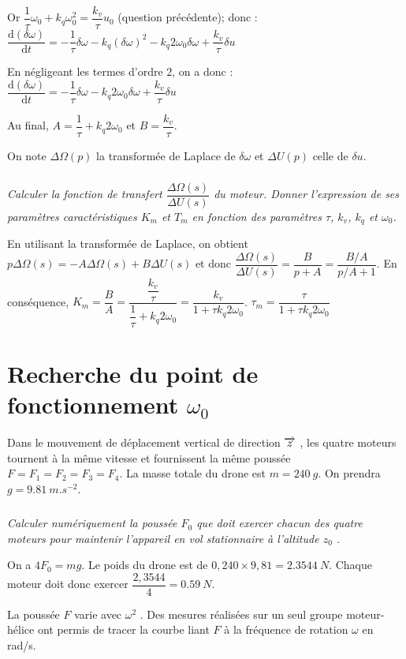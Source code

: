 \begin{multicols}{2}
\begin{corrige}
Or $\dfrac{1}{\tau}\omega_0 +k_q\omega_0^2 = \dfrac{k_v}{\tau}u_0$ (question précédente); donc :
$
\dfrac{\text{d}\left(\delta \omega \right)}{\text{d}t}= -\dfrac{1}{\tau}\delta \omega-k_q\left(\delta\omega\right)^2 -k_q2 \omega_0 \delta\omega + \dfrac{k_v}{\tau} \delta u
$

En négligeant les termes d'ordre 2, on a donc : 
$
\dfrac{\text{d}\left(\delta \omega \right)}{\text{d}t}= -\dfrac{1}{\tau}\delta \omega -k_q2 \omega_0 \delta\omega + \dfrac{k_v}{\tau} \delta u
$

Au final, $A=\dfrac{1}{\tau}+k_q2 \omega_0$ et $B=\dfrac{k_v}{\tau}$.
\end{corrige}
\else
\fi
On note $\Delta \Omega (p)$ la transformée de Laplace de $\delta \omega$ et $\Delta U(p)$ celle de $\delta u$.


\subparagraph{}\textit{Calculer la fonction de transfert $\dfrac{\Delta{\Omega(s)}}{\Delta U(s)}$ du moteur. Donner l'expression de ses paramètres caractéristiques $K_m$ et $T_m$ en fonction des paramètres $\tau$, $k_v$, $k_q$ et $\omega_0$.}
\ifprof
\begin{corrige}
En utilisant la transformée de Laplace, on obtient $p\Delta\Omega(s) = -A\Delta\Omega(s) + B \Delta U(s)$ et donc 
 $\dfrac{\Delta{\Omega(s)}}{\Delta U(s)}= \dfrac{B}{p+A} = \dfrac{B/A}{p/A+1}  $. 
 En conséquence, $K_m = \dfrac{B}{A} = \dfrac{\dfrac{k_v}{\tau}}{\dfrac{1}{\tau}+k_q2 \omega_0}= \dfrac{k_v}{1+\tau k_q2 \omega_0}$. 
 $\tau_m = \dfrac{\tau}{1+\tau k_q2 \omega_0} $ 
\end{corrige}
\else
\fi
\section*{Recherche du point de fonctionnement $\omega_0$}
Dans le mouvement de déplacement vertical de direction $\overrightarrow{z}$ , les quatre moteurs tournent à la même vitesse et fournissent la même poussée $F=F_1=F_2=F_3=F_4$.
La masse totale du drone est $m=\SI{240}{g}$. On prendra $g=\SI{9,81}{m.s^{-2}}$.

\subparagraph{}\textit{Calculer numériquement la poussée $F_0$ que doit exercer chacun des quatre moteurs pour maintenir l’appareil en vol stationnaire à l’altitude $z_0$ .}
\ifprof
\begin{corrige}
On a  $4 F_0 = mg$. 
Le poids du drone est de $0,240\times 9,81 = \SI{2,3544}{N}$. Chaque moteur doit donc exercer $\dfrac{2,3544}{4}=\SI{0,59}{N}$.
\end{corrige}
\else
\fi
La poussée $F$ varie avec $\omega^2$ . Des mesures réalisées sur un seul groupe moteur-hélice ont permis de tracer la courbe liant $F$ à la fréquence de rotation $\omega$ en rad/s.


\end{multicols}
